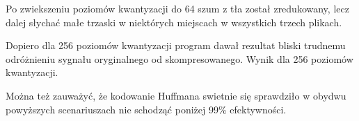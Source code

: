 \documentclass[12pt]{article}
\begin{document}
Po zwiekszeniu poziomów kwantyzacji do 64 szum z tła został zredukowany,
lecz dalej słychać małe trzaski w niektórych miejscach w wszystkich trzech plikach.

Dopiero dla 256 poziomów kwantyzacji program dawał rezultat bliski trudnemu odróżnieniu sygnału oryginalnego od skompresowanego.
Wynik dla 256 poziomów kwantyzacji.


Można też zauważyć, że kodowanie Huffmana swietnie się sprawdziło w obydwu powyższych scenariuszach nie schodząć poniżej 99\% efektywności.
\end{document}
